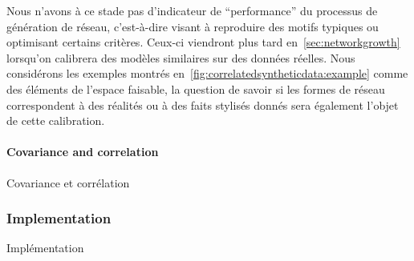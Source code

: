 Nous n'avons à ce stade pas d'indicateur de ``performance'' du processus de génération de réseau, c'est-à-dire visant à reproduire des motifs typiques ou optimisant certains critères. Ceux-ci viendront plus tard en~\ref{sec:networkgrowth} lorsqu'on calibrera des modèles similaires sur des données réelles. Nous considérons les exemples montrés en~\ref{fig:correlatedsyntheticdata:example} comme des éléments de l'espace faisable, la question de savoir si les formes de réseau correspondent à des réalités ou à des faits stylisés donnés sera également l'objet de cette calibration.




\paragraph{Covariance and correlation}{Covariance et corrélation}





\subsubsection{Implementation}{Implémentation}


